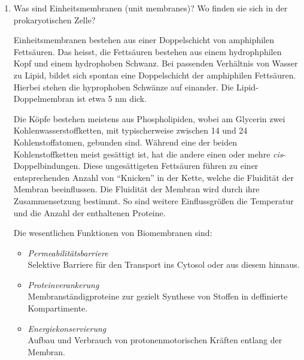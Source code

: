 \begin{enumerate}
	\item Was sind Einheitsmembranen (unit membranes)? Wo finden sie sich in der prokaryotischen Zelle?

		Einheitsmembranen bestehen aus einer Doppelschicht von amphiphilen Fettsäuren.
		Das heisst, die Fettsäuren bestehen aus einem hydrophphilen Kopf und einem hydrophoben Schwanz.
		Bei passenden Verhältnis von Wasser zu Lipid, bildet sich spontan eine Doppelschicht der amphiphilen Fettsäuren.
		Hierbei stehen die hyprophoben Schwänze auf einander.
		Die Lipid-Doppelmembran ist etwa 5 nm dick.
	
		Die Köpfe bestehen meistens aus Phospholipiden,
		wobei am Glycerin zwei Kohlenwasserstoffketten,
		mit typischerweise zwischen 14 und 24 Kohlenstoffatomen,
		gebunden sind.
		Während eine der beiden Kohlenstoffketten meist gesättigt ist,
		hat die andere einen oder mehre \textit{cis}-Doppelbindungen.
		Diese ungesättigeten Fettsäuren führen zu einer entsprechenden Anzahl von ``Knicken'' in der Kette,
		welche die Fluidität der Membran beeinflussen.
		Die Fluidität der Membran wird durch ihre Zusammensetzung bestimmt.
		So sind weitere Einflussgrößen die Temperatur und
		die Anzahl der enthaltenen Proteine.

		Die wesentlichen Funktionen von Biomembranen sind:

		\begin{itemize}
			\item \emph{Permeabilitätsbarriere} \hfill \\
			Selektive Barriere für den Transport ins Cytosol oder aus diesem hinnaus.
			\item\emph{Proteinverankerung} \hfill \\
			Membranständigproteine zur gezielt Synthese von Stoffen in deffinierte Kompartimente.
			\item\emph{Energiekonservierung} \hfill \\
			Aufbau und Verbrauch von protonenmotorischen Kräften entlang der Membran.
		\end{itemize}


\end{enumerate}
